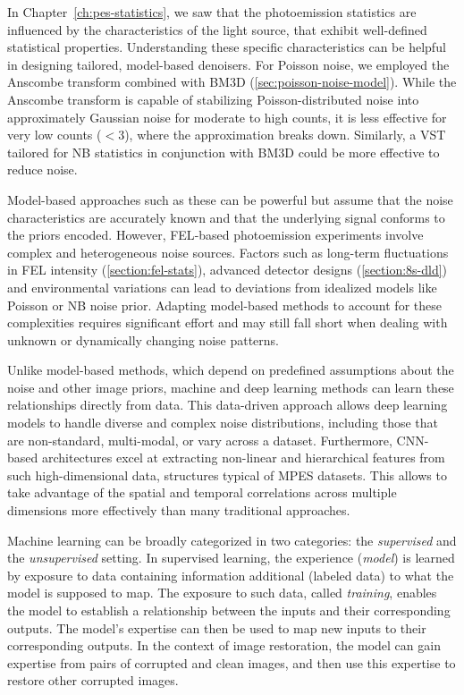 In Chapter~\ref{ch:pes-statistics}, we saw that the photoemission statistics are influenced by the characteristics of the light source, that exhibit well-defined statistical properties. Understanding these specific characteristics can be helpful in designing tailored, model-based denoisers. For Poisson noise, we employed the Anscombe transform combined with \gls{BM3D} (\cref{sec:poisson-noise-model}). While the Anscombe transform is capable of stabilizing Poisson-distributed noise into approximately Gaussian noise for moderate to high counts, it is less effective for very low counts ($<3$), where the approximation breaks down. Similarly, a \gls{VST} tailored for \gls{NB} statistics in conjunction with \gls{BM3D} could be more effective to reduce noise.

Model-based approaches such as these can be powerful but assume that the noise characteristics are accurately known and that the underlying signal conforms to the priors encoded. However, \gls{FEL}-based photoemission experiments involve complex and heterogeneous noise sources. Factors such as long-term fluctuations in \gls{FEL} intensity (\cref{section:fel-stats}), advanced detector designs (\cref{section:8s-dld}) and environmental variations can lead to deviations from idealized models like Poisson or \gls{NB} noise prior. Adapting model-based methods to account for these complexities requires significant effort and may still fall short when dealing with unknown or dynamically changing noise patterns.

Unlike model-based methods, which depend on predefined assumptions about the noise and other image priors, machine and deep learning methods can learn these relationships directly from data. This data-driven approach allows deep learning models to handle diverse and complex noise distributions, including those that are non-standard, multi-modal, or vary across a dataset. Furthermore, \gls{CNN}-based architectures excel at extracting non-linear and hierarchical features from such high-dimensional data, structures typical of \gls{MPES} datasets. This allows to take advantage of the spatial and temporal correlations across multiple dimensions more effectively than many traditional approaches.

Machine learning can be broadly categorized in two categories: the \textit{supervised} and the \textit{unsupervised} setting. In supervised learning, the experience (\textit{model}) is learned by exposure to data containing information additional (labeled data) to what the model is supposed to map. The exposure to such data, called \textit{training}, enables the model to establish a relationship between the inputs and their corresponding outputs. The model’s expertise can then be used to map new inputs to their corresponding outputs. In the context of image restoration, the model can gain expertise from pairs of corrupted and clean images, and then use this expertise to restore other corrupted images.

